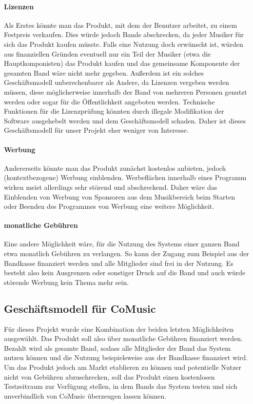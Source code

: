 \documentclass[12pt]{scrartcl}
\begin{document}
\paragraph{Lizenzen}
Als Erstes könnte man das Produkt, mit dem der Benutzer arbeitet, zu einem Festpreis verkaufen. Dies würde jedoch Bands abschrecken, da jeder Musiker für sich das Produkt kaufen müsste. Falls eine Nutzung doch erwünscht ist, würden aus finanziellen Gründen eventuell nur ein Teil der Musiker (etwa die Hauptkomponisten) das Produkt kaufen und das gemeinsame Komponente der gesamten Band wäre nicht mehr gegeben. Außerdem ist ein solches Geschäftsmodell unberechenbarer als Andere, da Lizenzen vergeben werden müssen, diese möglicherweise innerhalb der Band von mehreren Personen genutzt werden oder sogar für die Öffentlichkeit angeboten werden. Technische Funktionen für die Lizenzprüfung könnten durch illegale Modifikation der Software ausgehebelt werden und dem Geschäftsmodell schaden. Daher ist dieses Geschäftsmodell für unser Projekt eher weniger von Interesse.

\paragraph{Werbung}
Andererseits könnte man das Produkt zunächst kostenlos anbieten, jedoch (kontextbezogene) Werbung einblenden. Werbeflächen innerhalb eines Programm wirken meist allerdings sehr störend und abschreckend. Daher wäre das Einblenden von Werbung von Sponsoren aus dem Musikbereich beim Starten oder Beenden des Programmes von Werbung eine weitere Möglichkeit.

\paragraph{monatliche Gebühren}
Eine andere Möglichkeit wäre, für die Nutzung des Systems einer ganzen Band etwa monatlich Gebühren zu verlangen. So kann der Zugang zum Beispiel aus der Bandkasse finanziert werden und alle Mitglieder sind frei in der Nutzung. Es besteht also kein Ausgrenzen oder sonstiger Druck auf die Band und auch würde  störende Werbung kein Thema mehr sein.

\subsection{Geschäftsmodell für CoMusic}

Für dieses Projekt wurde eine Kombination der beiden letzten Möglichkeiten ausgewählt. Das Produkt soll also über monatliche Gebühren finanziert werden. Bezahlt wird als gesamte Band, sodass alle Mitglieder der Band das System nutzen können und die Nutzung beispielsweise aus der Bandkasse finanziert wird. Um das Produkt jedoch am Markt etablieren zu können und potentielle Nutzer nicht von Gebühren abzuschrecken, soll das Produkt einen kostenlosen Testzeitraum zur Verfügung stellen, in dem Bands das System testen und sich unverbindlich von CoMusic überzeugen lassen können.
\end{document}
